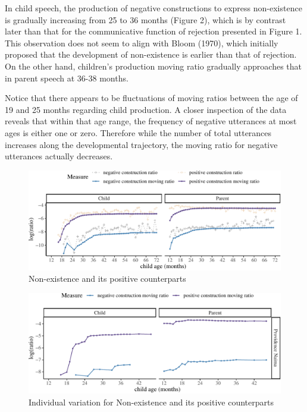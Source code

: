 \documentclass[
  english,
  man,floatsintext]{apa6}
\begin{document}
In child speech, the production of negative constructions to express non-existence is gradually increasing from 25 to 36 months (Figure 2), which is by contrast later than that for the communicative function of rejection presented in Figure 1. This observation does not seem to align with Bloom (1970), which initially proposed that the development of non-existence is earlier than that of rejection. On the other hand, children's production moving ratio gradually approaches that in parent speech at 36-38 months.

Notice that there appears to be fluctuations of moving ratios between the age of 19 and 25 months regarding child production. A closer inspection of the data reveals that within that age range, the frequency of negative utterances at most ages is either one or zero. Therefore while the number of total utterances increases along the developmental trajectory, the moving ratio for negative utterances actually decreases.

\begin{figure}[H]

{\centering \includegraphics{neg_construction_article_files/figure-latex/existence-1} 

}

\caption{Non-existence and its positive counterparts}\label{fig:existence}
\end{figure}

\begin{figure}[H]

{\centering \includegraphics{neg_construction_article_files/figure-latex/individualexistence-1} 

}

\caption{Individual variation for Non-existence and its positive counterparts}\label{fig:individualexistence}
\end{figure}
\end{document}
